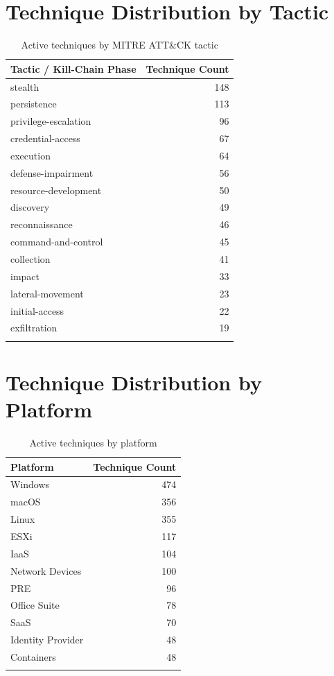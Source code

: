 \documentclass[12pt,a4paper]{report}
\newcommand{\ATTACK}{MITRE ATT\&CK}
\begin{document}
\section{Technique Distribution by Tactic}

\begin{longtable}{lr}
\toprule
\textbf{Tactic / Kill-Chain Phase} & \textbf{Technique Count} \\
\midrule
\endhead
stealth & 148 \\
persistence & 113 \\
privilege-escalation & 96 \\
credential-access & 67 \\
execution & 64 \\
defense-impairment & 56 \\
resource-development & 50 \\
discovery & 49 \\
reconnaissance & 46 \\
command-and-control & 45 \\
collection & 41 \\
impact & 33 \\
lateral-movement & 23 \\
initial-access & 22 \\
exfiltration & 19 \\
\bottomrule
\caption{Active techniques by \ATTACK{} tactic}
\end{longtable}

\section{Technique Distribution by Platform}

\begin{longtable}{lr}
\toprule
\textbf{Platform} & \textbf{Technique Count} \\
\midrule
\endhead
Windows & 474 \\
macOS & 356 \\
Linux & 355 \\
ESXi & 117 \\
IaaS & 104 \\
Network Devices & 100 \\
PRE & 96 \\
Office Suite & 78 \\
SaaS & 70 \\
Identity Provider & 48 \\
Containers & 48 \\
\bottomrule
\caption{Active techniques by platform}
\end{longtable}
\end{document}
